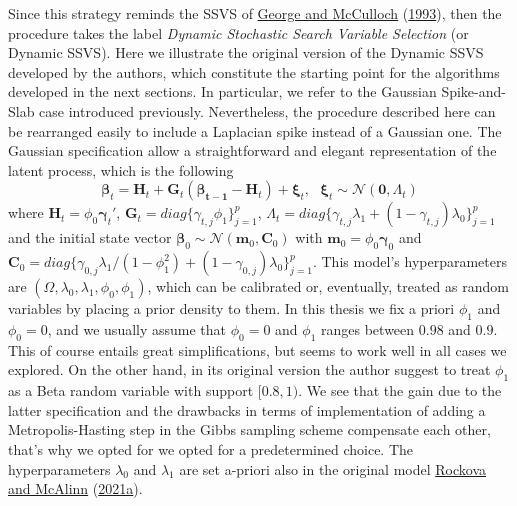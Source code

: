 \documentclass[
  12pt,
]{book}
\theoremstyle{break}
\theoremstyle{nonumberplain}
\begin{document}
Since this strategy reminds the SSVS of
\protect\hyperlink{ref-GM_1993}{George and McCulloch}
(\protect\hyperlink{ref-GM_1993}{1993}), then the procedure takes the
label \emph{Dynamic Stochastic Search Variable Selection} (or Dynamic
SSVS). Here we illustrate the original version of the Dynamic SSVS
developed by the authors, which constitute the starting point for the
algorithms developed in the next sections. In particular, we refer to
the Gaussian Spike-and-Slab case introduced previously. Nevertheless,
the procedure described here can be rearranged easily to include a
Laplacian spike instead of a Gaussian one. The Gaussian specification
allow a straightforward and elegant representation of the latent
process, which is the following \begin{equation}
\boldsymbol{\beta}_{t}=\boldsymbol{H}_{t}+\boldsymbol{G}_{t}(\boldsymbol{\beta_{t-1}}-\boldsymbol{H}_{t})+\boldsymbol{\xi}_{t}, \ \ \ \boldsymbol{\xi}_{t}\sim\mathcal{N}(\boldsymbol{0},\Lambda_{t})
\end{equation} where
\(\boldsymbol{H}_{t}=\phi_{0}\boldsymbol{\gamma}_{t}'\),
\(\boldsymbol{G}_{t}=diag\{\gamma_{t,j}\phi_{1}\}_{j=1}^{p}\),
\(\Lambda_{t}=diag\{\gamma_{t,j}\lambda_{1}+(1-\gamma_{t,j})\lambda_{0}\}_{j=1}^{p}\)
and the initial state vector
\(\boldsymbol{\beta}_{0}\sim\mathcal{N}(\boldsymbol{m}_{0},\boldsymbol{C}_{0})\)
with \(\boldsymbol{m}_{0}=\phi_{0}\boldsymbol{\gamma}_{0}\) and
\(\boldsymbol{C}_{0}=diag\{\gamma_{0,j}\lambda_{1}/(1-\phi_{1}^{2})+(1-\gamma_{0,j})\lambda_{0}\}_{j=1}^{p}\).
This model's hyperparameters are
\((\Omega,\lambda_{0},\lambda_{1},\phi_{0},\phi_{1})\), which can be
calibrated or, eventually, treated as random variables by placing a
prior density to them. In this thesis we fix a priori \(\phi_1\) and
\(\phi_0=0\), and we usually assume that \(\phi_0=0\) and \(\phi_1\)
ranges between \(0.98\) and \(0.9\). This of course entails great
simplifications, but seems to work well in all cases we explored. On the
other hand, in its original version the author suggest to treat
\(\phi_1\) as a Beta random variable with support \([0.8,1)\). We see
that the gain due to the latter specification and the drawbacks in terms
of implementation of adding a Metropolis-Hasting step in the Gibbs
sampling scheme compensate each other, that's why we opted for we opted
for a predetermined choice. The hyperparameters \(\lambda_0\) and
\(\lambda_1\) are set a-priori also in the original model
\protect\hyperlink{ref-rockova_mcalinn_2021}{Rockova and McAlinn}
(\protect\hyperlink{ref-rockova_mcalinn_2021}{2021a}).\\
\end{document}
